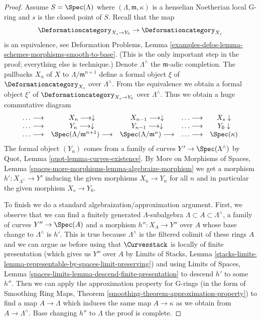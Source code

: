 \begin{proof}
\medskip\noindent
Assume $S = \Spec(\Lambda)$ where $(\Lambda, \mathfrak m, \kappa)$
is a henselian Noetherian local G-ring and $s$ is the closed point of $S$.
Recall that the map
$$
\Deformationcategory_{X_s \to Y_0} \to \Deformationcategory_{X_s}
$$
is an equivalence, see Deformation Problems, Lemma
\ref{examples-defos-lemma-schemes-morphisms-smooth-to-base}.
(This is the only important step in the proof; everything else
is technique.) Denote $\Lambda^\wedge$ the $\mathfrak m$-adic completion.
The pullbacks $X_n$ of $X$ to $\Lambda/\mathfrak m^{n + 1}$ define
a formal object $\xi$ of $\Deformationcategory_{X_s}$ over $\Lambda^\wedge$.
From the equivalence we obtain a formal object
$\xi'$ of $\Deformationcategory_{X_s \to Y_0}$ over $\Lambda^\wedge$.
Thus we obtain a huge commutative diagram
$$
\begin{array}{ccccc}\ldots \longrightarrow & X_n \longrightarrow\downarrow & X_{n - 1} \longrightarrow\downarrow & \ldots \longrightarrow & X_s \downarrow \\ \ldots \longrightarrow & Y_n \longrightarrow\downarrow & Y_{n - 1} \longrightarrow\downarrow & \ldots \longrightarrow & Y_0 \downarrow \\ \ldots \longrightarrow & \Spec(\Lambda/\mathfrak m^{n + 1}) \longrightarrow & \Spec(\Lambda/\mathfrak m^n) \longrightarrow & \ldots \longrightarrow & \Spec(\kappa)\end{array}
$$
The formal object $(Y_n)$ comes from a family of curves
$Y' \to \Spec(\Lambda^\wedge)$ by
Quot, Lemma \ref{quot-lemma-curves-existence}.
By More on Morphisms of Spaces, Lemma
\ref{spaces-more-morphisms-lemma-algebraize-morphism}
we get a morphism $h' : X_{\Lambda^\wedge} \to Y'$ inducing
the given morphisms $X_n \to Y_n$ for all $n$
and in particular the given morphism $X_s \to Y_0$.

\medskip\noindent
To finish we do a standard algebraization/approximation argument.
First, we observe that we can find a finitely generated $\Lambda$-subalgebra
$\Lambda \subset A \subset \Lambda^\wedge$, a family of curves
$Y'' \to \Spec(A)$ and a morphism $h'' : X_A \to Y''$ over $A$
whose base change to $\Lambda^\wedge$ is $h'$.
This is true because $\Lambda^\wedge$ is the filtered colimit
of these rings $A$ and we can argue as before using
that $\Curvesstack$ is locally of finite presentation
(which gives us $Y''$ over $A$ by
Limits of Stacks, Lemma
\ref{stacks-limits-lemma-representable-by-spaces-limit-preserving})
and using
Limits of Spaces, Lemma \ref{spaces-limits-lemma-descend-finite-presentation}
to descend $h'$ to some $h''$.
Then we can apply the approximation property for G-rings
(in the form of Smoothing Ring Maps, Theorem
\ref{smoothing-theorem-approximation-property})
to find a map $A \to \Lambda$ which induces the same map
$A \to \kappa$ as we obtain from $A \to \Lambda^\wedge$.
Base changing $h''$ to $\Lambda$ the proof is complete.
\end{proof}

